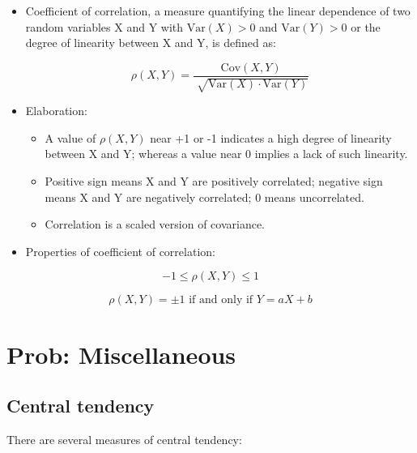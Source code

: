 \documentclass[12pt]{report}
\renewcommand{\_}{\kern-1.5pt\textunderscore\kern-1.5pt}
\begin{document}
\begin{itemize}
	\item Coefficient of correlation, a measure quantifying the linear dependence of two random variables X and Y with  \( \mathrm{Var} \left( X \right) >0 \)  and  \( \mathrm{Var} \left( Y \right) >0 \)  or the degree of linearity between X and Y, is defined as:\par

 \[  \rho  \left( X,Y \right) =\frac{\mathrm{Cov} \left( X,Y \right) }{\sqrt[]{\mathrm{Var} \left( X \right)  \cdot \mathrm{Var} \left( Y \right) }} \] \par

	\item Elaboration:\par

\begin{itemize}
	\item A value of  \(  \rho  \left( X,Y \right)  \)  near +1 or -1 indicates a high degree of linearity between X and Y; whereas a value near 0 implies a lack of such linearity.\par

	\item Positive sign means X and Y are positively correlated; negative sign means X and Y are negatively correlated; 0 means uncorrelated. \par

	\item Correlation is a scaled version of covariance.\par


\end{itemize}
	\item Properties of coefficient of correlation:
\end{itemize}\par

 \[ -1 \leq  \rho  \left( X,Y \right)  \leq 1 \] \par

 \[  \rho  \left( X,Y \right) = \pm 1\mathrm{\text{ if and only if }}Y=aX+b \] \par

\section*{Prob: Miscellaneous}
\subsection*{Central tendency}
	\item There are several measures of central tendency:\par
\end{document}
